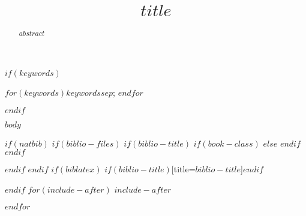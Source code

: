 \documentclass[]{interact}
\theoremstyle{plain}%
\theoremstyle{definition}
\theoremstyle{remark}
\begin{document}

\title{$title$}

\author{
}

\maketitle

\begin{abstract}
  $abstract$
\end{abstract}

 $if(keywords)$ \begin{keywords} $for(keywords)$$keywords$$sep$; $endfor$\end{keywords}$endif$


$body$

$if(natbib)$
$if(biblio-files)$
$if(biblio-title)$
$if(book-class)$
\renewcommand\bibname{$biblio-title$}
$else$
\renewcommand\refname{$biblio-title$}
$endif$
$endif$


$endif$
$endif$
$if(biblatex)$
\printbibliography$if(biblio-title)$[title=$biblio-title$]$endif$

$endif$
$for(include-after)$
$include-after$

$endfor$
\end{document}
